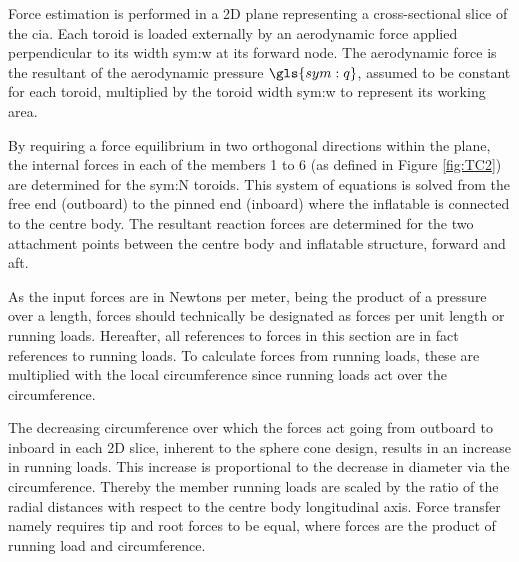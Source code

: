 Force estimation is performed in a 2D plane representing a cross-sectional slice of the \gls{cia}. Each toroid is loaded externally by an aerodynamic force applied perpendicular to its width \gls{sym:w} at its forward node. The aerodynamic force is the resultant of the aerodynamic pressure $\gls{sym:q}$, assumed to be constant for each toroid, multiplied by the toroid width \gls{sym:w} to represent its working area. 


By requiring a force equilibrium in two orthogonal directions within the plane, the internal forces in each of the members 1 to 6 (as defined in Figure \ref{fig:TC2}) are determined for the \gls{sym:N} toroids. This system of equations is solved from the free end (outboard) to the pinned end (inboard) where the inflatable is connected to the centre body. The resultant reaction forces are determined for the two attachment points between the centre body and inflatable structure, forward and aft.

As the input forces are in Newtons per meter, being the product of a pressure over a length, forces should technically be designated as forces per unit length or running loads. Hereafter, all references to forces in this section are in fact references to running loads. To calculate forces from running loads, these are multiplied with the local circumference since running loads act over the circumference.

The decreasing circumference over which the forces act going from outboard to inboard in each 2D slice, inherent to the sphere cone design, results in an increase in running loads. This increase is proportional to the decrease in diameter via the circumference. Thereby the member running loads are scaled by the ratio of the radial distances with respect to the centre body longitudinal axis. Force transfer namely requires tip and root forces to be equal, where forces are the product of running load and circumference.

